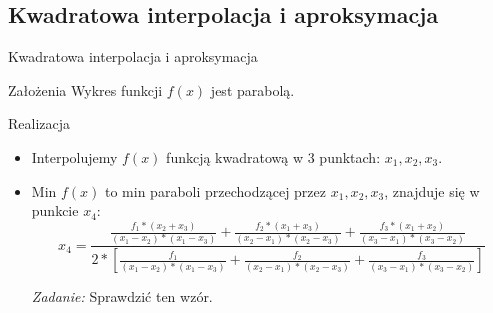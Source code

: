 \subsection{Kwadratowa interpolacja i aproksymacja}
  \begin{frame}{Kwadratowa interpolacja i aproksymacja}
    \begin{block}{Założenia}
      Wykres funkcji $f(x)$ jest parabolą.
    \end{block}
    \begin{block}{Realizacja}
      \begin{itemize}
        \item Interpolujemy $f(x)$ funkcją kwadratową w 3 punktach: $x_{1}{, }x_{2}{, }x_{3}$.
        \item Min $f(x) $ to min paraboli przechodzącej przez
        $x_{1}{, }x_{2}{, }x_{3}$, znajduje się w punkcie $x_4$:
        \begin{displaymath}
          x_4 = \frac{
            \frac{f_{1}*(x_{2}+x_{3})}{(x_{1}-x_{2})*(x_{1}-x_{3})} +
            \frac{f_{2}*(x_{1}+x_{3})}{(x_{2}-x_{1})*(x_{2}-x_{3})} +
            \frac{f_{3}*(x_{1}+x_{2})}{(x_{3}-x_{1})*(x_{3}-x_{2})}
          }{2 * \left[
            \frac{f_{1}}{(x_{1}-x_{2})*(x_{1}-x_{3})} +
            \frac{f_{2}}{(x_{2}-x_{1})*(x_{2}-x_{3})} +
            \frac{f_{3}}{(x_{3}-x_{1})*(x_{3}-x_{2})}
          \right]}
        \end{displaymath}
        \begin{flushright}
          \emph{Zadanie:} Sprawdzić ten wzór.
        \end{flushright}
      \end{itemize}
    \end{block}
  \end{frame}

